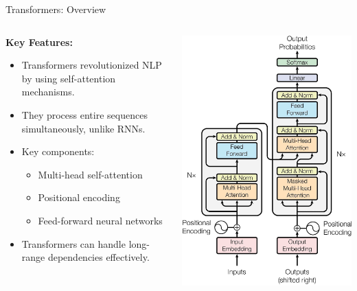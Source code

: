 \begin{frame}[allowframebreaks]{Transformers: Overview}
    \begin{columns}[T,onlytextwidth]
        \begin{column}{0.6\textwidth}
            \textbf{Key Features:}
            \begin{itemize}
                \setlength{\itemsep}{1em}
                \item Transformers revolutionized NLP by using self-attention mechanisms.
                \item They process entire sequences simultaneously, unlike RNNs.
                \item Key components:
                \begin{itemize}
                    \item Multi-head self-attention
                    \item Positional encoding
                    \item Feed-forward neural networks
                \end{itemize}
                \item Transformers can handle long-range dependencies effectively.
            \end{itemize}
        \end{column}
        \begin{column}{0.5\textwidth}
            \centering
            \includegraphics[width=\linewidth, height=0.9\textheight,keepaspectratio]{images/nlp/transformer-architecture.png}

\end{column}
\end{columns}
\end{frame}
